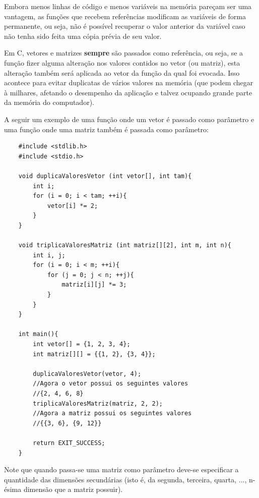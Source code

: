 \documentclass[12pt]{article}
\newcommand\tab[1][1cm]{\hspace*{#1}}
\begin{document}
\hspace{0.25cm}
\begin{tcolorbox}[colback=red!5!white,colframe=red!75!black,title=Cuidado!]
  \par\tab Embora menos linhas de código e menos variáveis na memória pareçam ser uma vantagem, as funções que recebem referências modificam as variáveis de forma permanente, ou seja, não é possível recuperar o valor anterior da variável caso não tenha sido feita uma cópia prévia de seu valor.
\end{tcolorbox}

\par\tab Em C, vetores e matrizes \textbf{sempre} são passados como referência, ou seja, se a função fizer alguma alteração nos valores contidos no vetor (ou matriz), esta alteração também será aplicada ao vetor da função da qual foi evocada. Isso acontece para evitar duplicatas de vários valores na memória (que podem chegar à milhares, afetando o desempenho da aplicação e talvez ocupando grande parte da memória do computador).

\par\tab A seguir um exemplo de uma função onde um vetor é passado como parâmetro e uma função onde uma matriz também é passada como parâmetro:

\hspace{0.25cm}
\begin{lstlisting}
    #include <stdlib.h>
    #include <stdio.h>

    void duplicaValoresVetor (int vetor[], int tam){
        int i;
        for (i = 0; i < tam; ++i){
            vetor[i] *= 2;
        }
    }
    
    void triplicaValoresMatriz (int matriz[][2], int m, int n){
        int i, j;
        for (i = 0; i < m; ++i){
            for (j = 0; j < n; ++j){
                matriz[i][j] *= 3;
            }
        }
    }
    
    int main(){
        int vetor[] = {1, 2, 3, 4};
        int matriz[][] = {{1, 2}, {3, 4}};
        
        duplicaValoresVetor(vetor, 4);
        //Agora o vetor possui os seguintes valores
        //{2, 4, 6, 8}
        triplicaValoresMatriz(matriz, 2, 2);
        //Agora a matriz possui os seguintes valores
        //{{3, 6}, {9, 12}}
        
        return EXIT_SUCCESS;
    }
\end{lstlisting}

\hspace{0.25cm}
\begin{tcolorbox}[colback=yellow!5!white,colframe=yellow!75!black,title=Atenção!]
  \par\tab Note que quando passa-se uma matriz como parâmetro deve-se especificar a quantidade das dimensões secundárias (isto é, da segunda, terceira, quarta, ..., n-ésima dimensão que a matriz possuir).
\end{tcolorbox}
\end{document}
